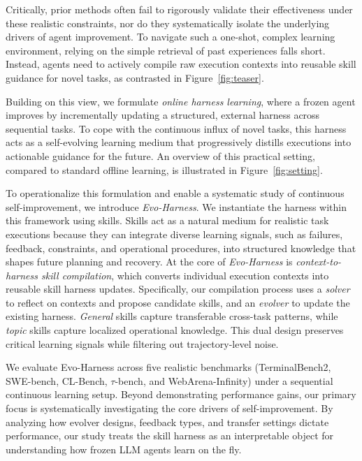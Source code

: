 Critically, prior methods often fail to rigorously validate their effectiveness under these realistic constraints, nor do they systematically isolate the underlying drivers of agent improvement. To navigate such a one-shot, complex learning environment, relying on the simple retrieval of past experiences falls short. Instead, agents need to actively compile raw execution contexts into reusable skill guidance for novel tasks, as contrasted in Figure~\ref{fig:teaser}.

Building on this view, we formulate \emph{online harness learning}, where a frozen agent improves by incrementally updating a structured, external harness across sequential tasks. To cope with the continuous influx of novel tasks, this harness acts as a self-evolving learning medium that progressively distills executions into actionable guidance for the future. An overview of this practical setting, compared to standard offline learning, is illustrated in Figure~\ref{fig:setting}.

To operationalize this formulation and enable a systematic study of continuous self-improvement, we introduce \emph{Evo-Harness}. We instantiate the harness within this framework using skills. Skills act as a natural medium for realistic task executions because they can integrate diverse learning signals, such as failures, feedback, constraints, and operational procedures, into structured knowledge that shapes future planning and recovery. At the core of \emph{Evo-Harness} is \emph{context-to-harness skill compilation}, which converts individual execution contexts into reusable skill harness updates. Specifically, our compilation process uses a \emph{solver} to reflect on contexts and propose candidate skills, and an \emph{evolver} to update the existing harness. \emph{General} skills capture transferable cross-task patterns, while \emph{topic} skills capture localized operational knowledge. This dual design preserves critical learning signals while filtering out trajectory-level noise.

We evaluate Evo-Harness across five realistic benchmarks (TerminalBench2, SWE-bench, CL-Bench, $\tau$-bench, and WebArena-Infinity) under a sequential continuous learning setup. Beyond demonstrating performance gains, our primary focus is systematically investigating the core drivers of self-improvement. By analyzing how evolver designs, feedback types, and transfer settings dictate performance, our study treats the skill harness as an interpretable object for understanding how frozen LLM agents learn on the fly.


